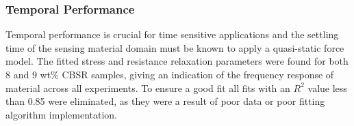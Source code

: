 
\subsubsection{Temporal Performance}\label{sec:Temporal Performance2}
Temporal performance is crucial for time sensitive applications and the settling time of the sensing material domain must be known to apply a quasi-static force model. The fitted stress and resistance relaxation parameters were found for both 8 and 9 wt\% CBSR samples, giving an indication of the frequency response of material across all experiments. To ensure a good fit all fits with an $R^2$ value less than 0.85 were eliminated, as they were a result of poor data or poor fitting algorithm implementation.


    

